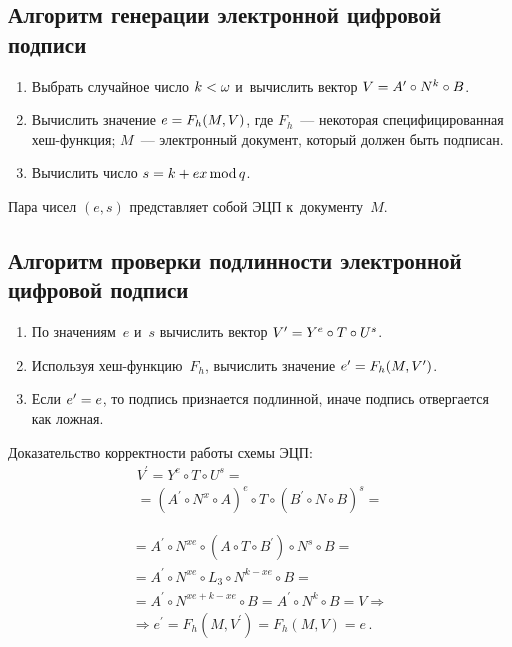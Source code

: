 \begin{multicols}{2}
  \vspace*{-6pt}
  
  \subsection*{Алгоритм генерации электронной цифровой подписи}
  
  \noindent
  \begin{enumerate}[1.]
  \item Выбрать случайное число $k\hm<\omega$ и~вычислить вектор $V\hm= 
A^\prime \circ N^k\circ B$.
  \item Вычислить значение $e\hm= F_h(M,V)$, где $F_h$~--- некоторая 
специфицированная хеш-функ\-ция; $M$~--- электронный документ, который 
должен быть подписан.
  \item Вычислить число $s\hm= k\hm+ex\,\mathrm{mod}\,q$.
  \end{enumerate}
  
  Пара чисел $(e,s)$ представляет собой ЭЦП к~документу~$M$.
  
  \vspace*{-6pt}
  
  \subsection*{Алгоритм проверки подлинности электронной цифровой подписи}
  
  \noindent
  \begin{enumerate}[1.]
  
  \item По значениям~$e$ и~$s$ вычислить вектор $V^\prime\hm= Y^e\circ 
T\circ U^s$. 
  \item Используя хеш-функ\-цию~$F_h$, вычислить значение $e^\prime\hm= 
F_h(M,V^\prime)$.
  \item Если $e^\prime\hm=e$, то подпись признается подлинной, иначе 
подпись отвергается как ложная. 
  \end{enumerate}
  
  Доказательство корректности работы схемы ЭЦП: 
  \begin{multline*}
 V^\prime =Y^e\circ T\circ U^s ={}\\
 {}=\left( A^\prime\circ N^x\circ A\right)^e\circ 
T\circ \left( B^\prime \circ N\circ B\right)^s={}
\end{multline*}

\noindent
  \begin{multline*}
    {}= A^\prime \circ N^{xe} \circ(A\circ T\circ B^\prime)\circ N^s\circ B= {}\\
{}=A^\prime \circ N^{xe}\circ L_3\circ N^{k-xe}\circ B={}\\
  {}= A^\prime \circ N^{xe+k-xe} \circ B =A^\prime \circ N^k \circ B 
=V\Rightarrow{}\\
{}\Rightarrow 
  e^\prime =F_h(M,V^\prime) =F_h(M,V)=e\,.
  \end{multline*}
  

\end{multicols}
